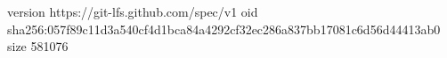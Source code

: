 version https://git-lfs.github.com/spec/v1
oid sha256:057f89c11d3a540cf4d1bca84a4292cf32ec286a837bb17081c6d56d44413ab0
size 581076

